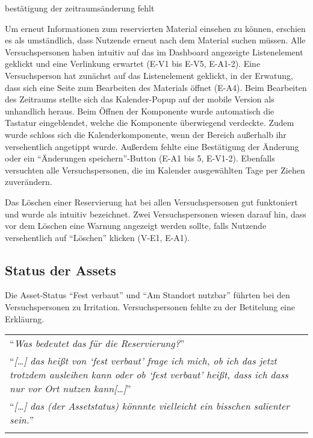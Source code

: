 bestätigung der zeitraumsänderung fehlt



Um erneut Informationen zum reservierten Material einsehen zu können, erschien es als umständlich,
dass Nutzende erneut nach dem Material suchen müssen. Alle Versuchspersonen haben intuitiv auf das
im Dashboard angezeigte Listenelement geklickt und eine Verlinkung erwartet (E-V1 bis E-V5, E-A1-2).
Eine Versuchsperson hat zunächst auf das Listenelement geklickt, in der Erwatung, dass sich eine
Seite zum Bearbeiten des Materials öffnet (E-A4). Beim Bearbeiten des Zeitraums stellte sich das
Kalender-Popup auf der mobile Version als unhandlich heraus. Beim Öffnen der Komponente wurde
automatisch die Tastatur eingeblendet, welche die Komponente überwiegend verdeckte. Zudem wurde
schloss sich die Kalenderkomponente, wenn der Bereich außerhalb ihr versehentlich angetippt wurde.
Außerdem fehlte eine Bestätigung der Änderung oder ein \enquote{Änderungen speichern}-Button (E-A1
bis 5, E-V1-2). Ebenfalls versuchten alle Versuchspersonen, die im Kalender ausgewählten Tage per
Ziehen zuverändern.

Das Löschen einer Reservierung hat bei allen Versuchspersonen gut funktoniert
und wurde als intuitiv bezeichnet. Zwei Versuchspersonen wiesen darauf hin, dass vor dem
Löschen eine Warnung angezeigt werden sollte, falls Nutzende versehentlich auf \enquote{Löschen}
klicken (V-E1, E-A1).


\subsection{Status der Assets}
Die Asset-Status \enquote{Fest verbaut} und \enquote{Am Standort nutzbar} führten
bei den Versuchspersonen zu Irritation. Versuchspersonen fehlte zu der Betitelung
eine Erkläurng.

\begin{longtable}{p{}} \arrayrulecolor{maincolor}\hline
  \enquote{\textit{Was bedeutet das für die Reservierung?}} \\
  \enquote{\textit{[\dots] das heißt von \enquote{fest verbaut} frage ich mich,
      ob ich das jetzt trotzdem ausleihen kann oder ob \enquote{fest verbaut} heißt,
  dass ich dass nur vor Ort nutzen kann[\dots]}}            \\
  \enquote{\textit{[\dots] das (der Assetstatus) könnnte vielleicht ein bisschen
  salienter sein.}}                                         \\
  \arrayrulecolor{maincolor}\hline
\end{longtable}

